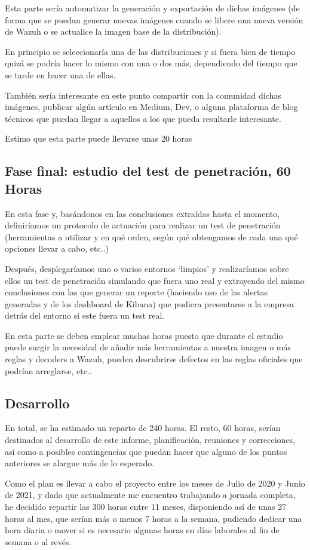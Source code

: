 Esta parte sería automatizar la generación y exportación de dichas imágenes (de forma que se puedan generar nuevas imágenes cuando se libere una nueva versión de Wazuh o se actualice la imagen base de la distribución). 

En principio se seleccionaría una de las distribuciones y si fuera bien de tiempo quizá se podría hacer lo mismo con una o dos más, dependiendo del tiempo que se tarde en hacer una de ellas.

También sería interesante en este punto compartir con la comunidad dichas imágenes, publicar algún artículo en Medium, Dev, o alguna plataforma de blog técnicos que puedan llegar a aquellos a los que pueda resultarle interesante.

Estimo que esta parte puede llevarse unas 20 horas

\subsection{Fase final: estudio del test de penetración, 60 Horas}

En esta fase y, basándonos en las conclusiones extraídas hasta el momento, definiríamos un protocolo de actuación para realizar un test de penetración (herramientas a utilizar y en qué orden, según qué obtengamos de cada una qué opciones llevar a cabo, etc..)

Después, desplegaríamos uno o varios entornos `limpios' y realizaríamos sobre ellos un test de penetración simulando que fuera uno real y extrayendo del mismo conclusiones con las que generar un reporte (haciendo uso de las alertas generadas y de los dashboard de Kibana) que pudiera presentarse a la empresa detrás del entorno si este fuera un test real.

En esta parte se deben emplear muchas horas puesto que durante el estudio puede surgir la necesidad de añadir más herramientas a nuestra imagen o más reglas y decoders a Wazuh, pueden descubrirse defectos en las reglas oficiales que podrían arreglarse, etc..

\bigskip

\subsection*{Desarrollo}

En total, se ha estimado un reparto de 240 horas. El resto, 60 horas, serían destinados al desarrollo de este informe, planificación, reuniones y correcciones, así como a posibles contingencias que puedan hacer que alguno de los puntos anteriores se alargue más de lo esperado.  

Como el plan es llevar a cabo el proyecto entre los meses de Julio de 2020 y Junio de 2021, y dado que actualmente me encuentro trabajando a jornada completa, he decidido repartir las 300 horas entre 11 meses, disponiendo así de unas 27 horas al mes, que serían más o menos 7 horas a la semana, pudiendo dedicar una hora diaria o mover si es necesario algunas horas en días laborales al fin de semana o al revés. 

